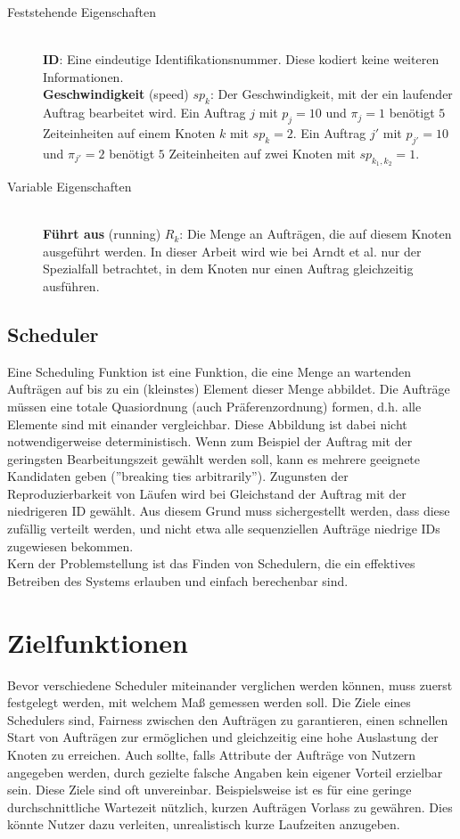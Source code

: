 \begin{description}
	\item[Feststehende Eigenschaften] \hfil \\
	\textbf{ID}: Eine eindeutige Identifikationsnummer. Diese kodiert keine weiteren Informationen.\\
	\textbf{Geschwindigkeit} (speed) $sp_k$: Der Geschwindigkeit, mit der ein laufender Auftrag bearbeitet wird. Ein Auftrag $j$ mit $p_j = 10$ und $\pi_j = 1$ benötigt $5$ Zeiteinheiten auf einem Knoten $k$ mit $sp_k = 2$. Ein Auftrag $j'$ mit $p_{j'} = 10$ und $\pi_{j'} = 2$ benötigt $5$ Zeiteinheiten auf zwei Knoten mit $sp_{k_1, k_2} = 1$.\\
	\item[Variable Eigenschaften] \hfil \\
	\textbf{Führt aus} (running) $R_k$: Die Menge an Aufträgen, die auf diesem Knoten ausgeführt werden. In dieser Arbeit wird wie bei Arndt et al. \cite{Arn99} nur der Spezialfall betrachtet, in dem Knoten nur einen Auftrag gleichzeitig ausführen.\\
\end{description}


\subsection{Scheduler}
Eine Scheduling Funktion ist eine Funktion, die eine Menge an wartenden Aufträgen auf bis zu ein (kleinstes) Element dieser Menge abbildet. Die Aufträge müssen eine totale Quasiordnung (auch  Präferenzordnung) formen, d.h. alle Elemente sind mit einander vergleichbar.
Diese Abbildung ist dabei nicht notwendigerweise deterministisch. Wenn zum Beispiel der Auftrag mit der geringsten Bearbeitungszeit gewählt werden soll, kann es mehrere geeignete Kandidaten geben (''breaking ties arbitrarily'')\cite{Kar97}. Zugunsten der Reproduzierbarkeit von Läufen wird bei Gleichstand der Auftrag mit der niedrigeren ID gewählt. Aus diesem Grund muss sichergestellt werden, dass diese zufällig verteilt werden, und nicht etwa alle sequenziellen Aufträge niedrige IDs zugewiesen bekommen.\\
Kern der Problemstellung ist das Finden von Schedulern, die ein effektives Betreiben des Systems erlauben und einfach berechenbar sind.

\section{Zielfunktionen}
\label{2-zielfunktionen}
Bevor verschiedene Scheduler miteinander verglichen werden können, muss zuerst festgelegt werden, mit welchem Maß gemessen werden soll. Die Ziele eines Schedulers sind, Fairness zwischen den Aufträgen zu garantieren, einen schnellen Start von Aufträgen zur ermöglichen und gleichzeitig eine hohe Auslastung der Knoten zu erreichen. Auch sollte, falls Attribute der Aufträge von Nutzern angegeben werden, durch gezielte falsche Angaben kein eigener Vorteil erzielbar sein. Diese Ziele sind oft unvereinbar. Beispielsweise ist es für eine geringe durchschnittliche Wartezeit nützlich, kurzen Aufträgen Vorlass zu gewähren. Dies könnte Nutzer dazu verleiten, unrealistisch kurze Laufzeiten anzugeben.


